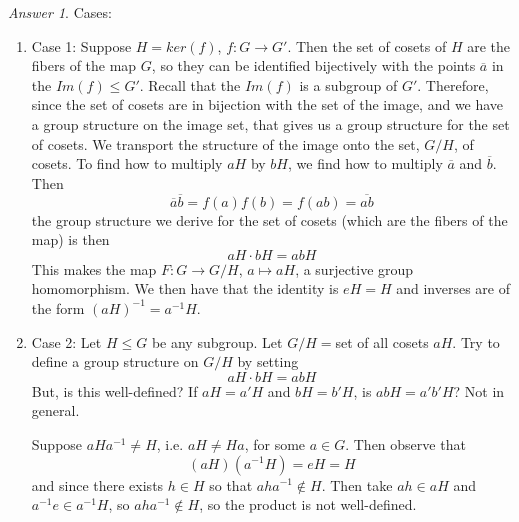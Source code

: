 \documentclass[12pt]{article}
\theoremstyle{definition}
\theoremstyle{remark}
\newtheorem*{ans}{Answer}
\numberwithin{equation}{section}
\begin{document}
\begin{ans}
        Cases: \begin{enumerate}
                \item Case 1: Suppose $H = ker(f)$, $f:G\rightarrow G'$. Then the set of cosets of $H$ are the fibers of the map $G$, so they can be identified bijectively with the points $\overline{a}$ in the $Im(f) \leq G'$. Recall that the $Im(f)$ is a subgroup of $G'$. Therefore, since the set of cosets are in bijection with the set of the image, and we have a group structure on the image set, that gives us a group structure for the set of cosets. We transport the structure of the image onto the set, $G/H$, of cosets. To find how to multiply $aH$ by $bH$, we find how to multiply $\overline{a}$ and $\overline{b}$. Then \begin{equation}
                                \overline{a}\overline{b} = f(a)f(b)=f(ab)=\overline{ab}
                \end{equation}
                        the group structure we derive for the set of cosets (which are the fibers of the map) is then \begin{equation}
                                aH\cdot bH = abH
                        \end{equation}
                        This makes the map $F: G \rightarrow G/H$, $a \mapsto aH$, a surjective group homomorphism. We then have that the identity is $eH = H$ and inverses are of the form $(aH)^{-1}=a^{-1}H$.
                \item Case 2: Let $H \leq G$ be any subgroup. Let $G/H = $set of all cosets $aH$. Try to define a group structure on $G/H$ by setting \begin{equation}
                                aH\cdot bH = abH
                \end{equation}
                        But, is this well-defined? If $aH = a'H$ and $bH = b'H$, is $abH = a'b'H$? Not in general.

                        Suppose $aHa^{-1} \neq H$, i.e. $aH \neq Ha$, for some $a \in G$. Then observe that $$(aH)(a^{-1}H) = eH = H$$ and since there exists $h \in H$ so that $aha^{-1} \notin H$. Then take $ah\in aH$ and $a^{-1}e \in a^{-1}H$, so $aha^{-1} \notin H$, so the product is not well-defined.
        \end{enumerate}
\end{ans}

\vspace{15pt}
\end{document}
